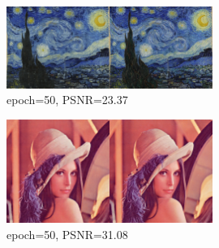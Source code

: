 \documentclass{article}
\begin{document}
\begin{figure}[h]
    \centering
    \includegraphics[width=0.6\textwidth]{starry_night.jpg}
    \caption{epoch=50, PSNR=23.37}
\end{figure}

\begin{figure}[h]
    \centering
    \includegraphics[width=0.6\textwidth]{lena.png}
    \caption{epoch=50, PSNR=31.08}
\end{figure}
\end{document}
